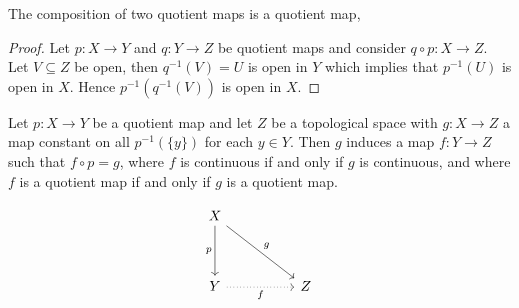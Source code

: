 \begin{lemma}\label{2.2.3}
    The composition of two quotient maps is a quotient map,
\end{lemma}
\begin{proof}
    Let $p:X \rightarrow Y$ and  $q:Y \rightarrow Z$ be quotient maps and consider  $q \circ p:X
    \rightarrow Z$. Let $V \subseteq Z$ be open, then  $q^{-1}(V)=U$ is open in $Y$ which implies
    that  $p^{-1}(U)$ is open in $X$. Hence  $p^{-1}(q^{-1}(V))$ is open in $X$.
\end{proof}

\begin{theorem}\label{2.4.5}
    Let $p:X \rightarrow Y$ be a quotient map and let  $Z$ be a topological space with  $g:X
    \rightarrow Z$ a map constant on all  $p^{-1}(\{y\})$ for each $y \in Y$. Then  $g$ induces a
    map $f:Y \rightarrow Z$ such that  $f \circ p=g$, where  $f$ is continuous if and only if  $g$
    is continuous, and where  $f$ is a quotient map if and only if  $g$ is a quotient map.
\end{theorem}

\[\begin{tikzcd}
	X \\
	\\
	Y && Z
	\arrow["g", from=1-1, to=3-3]
	\arrow["f"', dotted, from=3-1, to=3-3]
	\arrow["p"', from=1-1, to=3-1]
\end{tikzcd}\]

